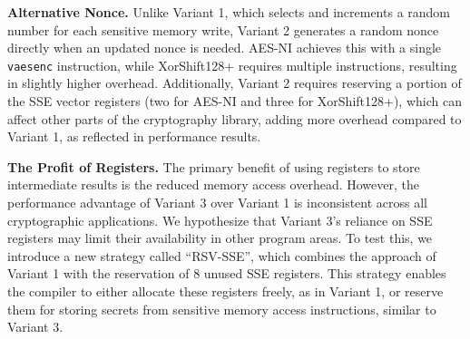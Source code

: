 \noindent \textbf{Alternative Nonce.}
Unlike Variant 1, which selects and increments a random number for each sensitive memory write, Variant 2 generates a random nonce directly when an updated nonce is needed. 
AES-NI achieves this with a single \texttt{vaesenc} instruction, while XorShift128+ requires multiple instructions, resulting in slightly higher overhead. 
Additionally, Variant 2 requires reserving a portion of the SSE vector registers (two for AES-NI and three for XorShift128+), which can affect other parts of the cryptography library, adding more overhead compared to Variant 1, as reflected in performance results.

\noindent \textbf{The Profit of Registers.}
The primary benefit of using registers to store intermediate results is the reduced memory access overhead. 
However, the performance advantage of Variant 3 over Variant 1 is inconsistent across all cryptographic applications. 
We hypothesize that Variant 3's reliance on SSE registers may limit their availability in other program areas. 
To test this, we introduce a new strategy called ``RSV-SSE'', which combines the approach of Variant 1 with the reservation of 8 unused SSE registers. 
This strategy enables the compiler to either allocate these registers freely, as in Variant 1, or reserve them for storing secrets from sensitive memory access instructions, similar to Variant 3.

